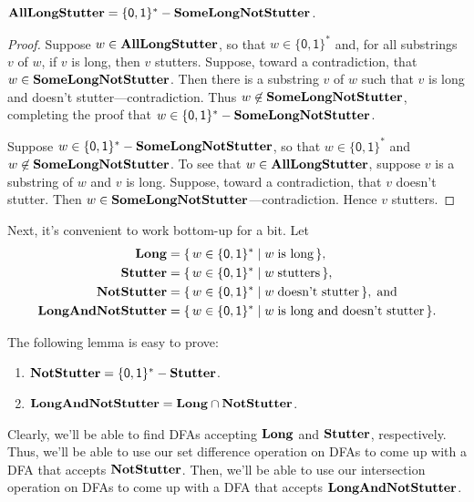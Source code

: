 \begin{lemma}
\label{Stutter1}
$\mathbf{AllLongStutter} = \{\mathsf{0,1}\}^*-\mathbf{SomeLongNotStutter }$.
\end{lemma}

\begin{proof}
Suppose $w\in\mathbf{AllLongStutter}$, so that
$w\in\{\mathsf{0,1}\}^*$ and, for all substrings $v$ of $w$,
if $v$ is long, then $v$ stutters.  Suppose, toward a contradiction,
that $w\in\mathbf{SomeLongNotStutter }$.  Then there is a substring $v$ of
$w$ such that $v$ is long and doesn't stutter---contradiction.
Thus $w\not\in\mathbf{SomeLongNotStutter }$, completing the proof
that $w\in \{\mathsf{0,1}\}^*-\mathbf{SomeLongNotStutter }$.

Suppose $w\in\{\mathsf{0,1}\}^*-\mathbf{SomeLongNotStutter }$, so that
$w\in\{\mathsf{0,1}\}^*$ and $w\not\in
\mathbf{SomeLongNotStutter }$.  To see that $w\in\mathbf{AllLongStutter}$,
suppose $v$ is a substring of $w$ and $v$ is long.  Suppose, toward a
contradiction, that $v$ doesn't stutter.  Then
$w\in\mathbf{SomeLongNotStutter }$---contradiction.  Hence $v$ stutters.
\end{proof}

Next, it's convenient to work bottom-up for a bit.  Let
\begin{align*}
\mathbf{Long} &= \{ \, w\in\{\mathsf{0,1}\}^* \mid w\;\allowbreak\mbox{is long}\allowbreak \, \} , \\
\mathbf{Stutter} &= \{ \, w\in\{\mathsf{0,1}\}^* \mid w\;\allowbreak\mbox{stutters}\allowbreak \, \} , \\
\mathbf{NotStutter} &= \{ \, w\in\{\mathsf{0,1}\}^* \mid w\;\allowbreak\mbox{doesn't stutter}\allowbreak \, \} ,
  \;\allowbreak\mbox{and}\allowbreak\; \\
\mathbf{LongAndNotStutter} &=
\{ \, w\in\{\mathsf{0,1}\}^* \mid w\;\allowbreak\mbox{is long and doesn't stutter}\allowbreak \, \} .
\end{align*}

The following lemma is easy to prove:

\begin{lemma}
\label{Stutter2}
\begin{enumerate}[\quad(1)]
\item $\mathbf{NotStutter} = \{\mathsf{0,1}\}^* - \mathbf{Stutter}$.

\item $\mathbf{LongAndNotStutter} = \mathbf{Long}\cap\mathbf{NotStutter}$.
\end{enumerate}
\end{lemma}

Clearly, we'll be able to find DFAs accepting $\mathbf{Long}$ and $\mathbf{Stutter}$,
respectively.  Thus, we'll be able to use our set difference operation
on DFAs to come up with a DFA that accepts $\mathbf{NotStutter}$.  Then,
we'll be able to use our intersection operation on DFAs to come
up with a DFA that accepts $\mathbf{LongAndNotStutter}$.

